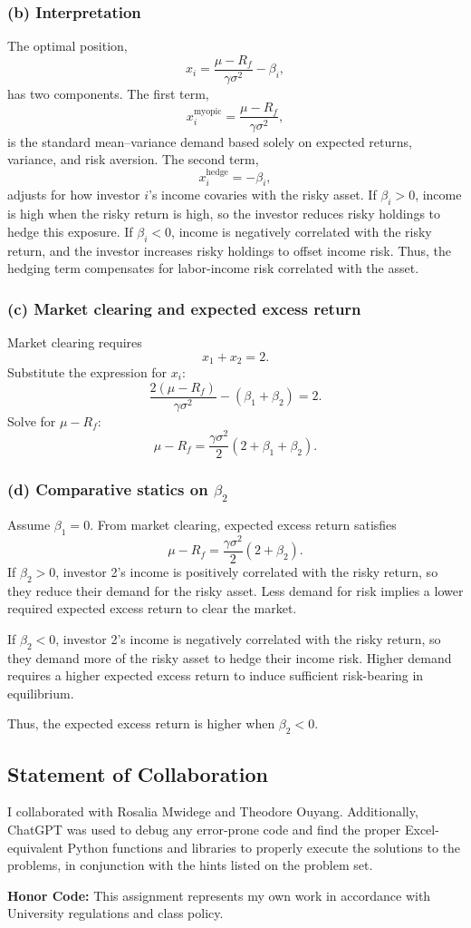 \subsubsection*{(b) Interpretation}

The optimal position,
\[
x_i = \frac{\mu - R_f}{\gamma\sigma^2} - \beta_i,
\]
has two components. The first term,
\[
x_i^{\text{myopic}} = \frac{\mu - R_f}{\gamma\sigma^2},
\]
is the standard mean--variance demand based solely on expected returns, variance, and risk aversion. The second term,
\[
x_i^{\text{hedge}} = -\beta_i,
\]
adjusts for how investor $i$'s income covaries with the risky asset. If $\beta_i > 0$, income is high when the risky return is high, so the investor reduces risky holdings to hedge this exposure. If $\beta_i < 0$, income is negatively correlated with the risky return, and the investor increases risky holdings to offset income risk. Thus, the hedging term compensates for labor-income risk correlated with the asset.

\subsubsection*{(c) Market clearing and expected excess return}
Market clearing requires
$$
x_1 + x_2 = 2.
$$
Substitute the expression for $x_i$:
$$
\frac{2(\mu - R_f)}{\gamma\sigma^2} - (\beta_1 + \beta_2) = 2.
$$
Solve for $\mu - R_f$:
$$
\boxed{ \; \mu - R_f = \frac{\gamma\sigma^2}{2}\left(2 + \beta_1 + \beta_2\right). \; }
$$

\subsubsection*{(d) Comparative statics on $\beta_2$}

Assume $\beta_1 = 0$. From market clearing, expected excess return satisfies
\[
\mu - R_f = \frac{\gamma\sigma^2}{2}(2 + \beta_2).
\]
If $\beta_2 > 0$, investor 2's income is positively correlated with the risky return, so they reduce their demand for the risky asset. Less demand for risk implies a lower required expected excess return to clear the market.

If $\beta_2 < 0$, investor 2's income is negatively correlated with the risky return, so they demand more of the risky asset to hedge their income risk. Higher demand requires a higher expected excess return to induce sufficient risk-bearing in equilibrium.

Thus, the expected excess return is higher when $\beta_2 < 0$.


\subsection*{Statement of Collaboration} I collaborated with Rosalia Mwidege and Theodore Ouyang. Additionally, ChatGPT was used
to debug any error-prone code and find the proper Excel-equivalent Python
functions and libraries to properly execute the solutions to the problems, in
conjunction with the hints listed on the problem set.

\textbf{Honor Code:} This assignment represents my own work in accordance with
University regulations and class policy.

